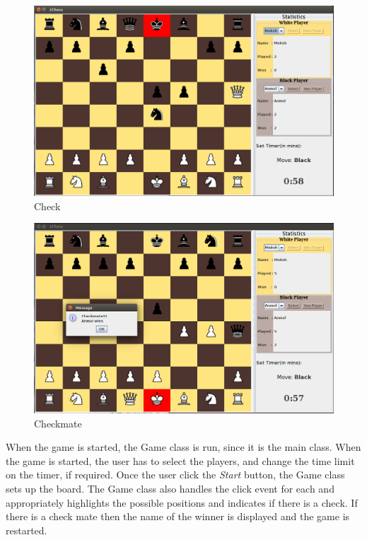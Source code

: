 \begin{figure}[htb]
\centering
\includegraphics[scale=0.2]{SS-Check.png} %
\caption{Check}
\label{fig:label} %
\end{figure}

\begin{figure}[htb]
\centering
\includegraphics[scale=0.2]{SS-CheckMate.png} %
\caption{Checkmate}
\label{fig:label} %
\end{figure}

When the game is started, the Game class is run, since it is the main class. When the game is started, the user has to select the players, and change the time limit on the timer, if required. Once the user click the \textit{Start} button, the Game class sets up the board. The Game class also handles the click event for each and appropriately highlights the possible positions and indicates if there is a check. If there is a check mate then the name of the winner is displayed and the game is restarted.

